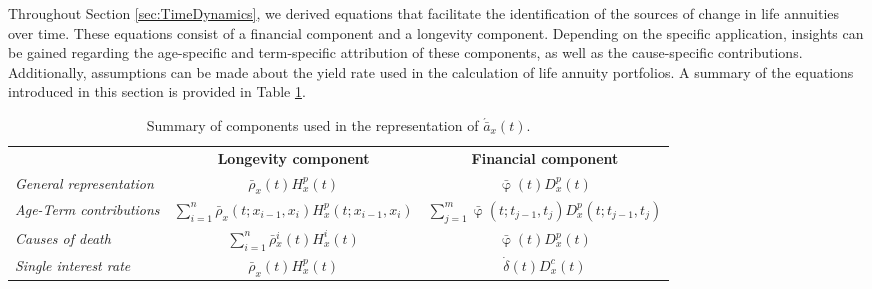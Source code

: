 \documentclass[12pt]{article}
\begin{document}
Throughout Section \ref{sec:TimeDynamics}, we derived equations that facilitate the identification of the sources of change in life annuities over time. These equations consist of a financial component and a longevity component. Depending on the specific application, insights can be gained regarding the age-specific and term-specific attribution of these components, as well as the cause-specific contributions. Additionally, assumptions can be made about the yield rate used in the calculation of life annuity portfolios. A summary of the equations introduced in this section is provided in Table \ref{table:Table1}.

\begin{table}[ht]
	\color{blue}
	\centering
	\begin{tabular}{lcc}
		\toprule
		\textbf{}&	\textbf{Longevity component} & \textbf{Financial component}   \\
	
		\textit{General representation}&	$\bar{\rho}_x(t){H}^{p}_x(t)$ & $\bar{\upvarphi}(t){D}^{p}_x(t)$ \\
		\textit{Age-Term contributions}&	$\sum_{i=1}^n\bar{\rho}_x(t;x_{i-1}, x_i){H}^{p}_x(t;x_{i-1}, x_i)$ & $\sum_{j=1}^m\bar{\upvarphi}(t;t_{j-1},t_{j}){D}^{p}_x(t;t_{j-1},t_{j})$ \\
		
		\textit{Causes of death}&	$\sum_{i=1}^{n} \bar{\rho}{^i_x}(t){H}^{i}_x(t)$ & $\bar{\upvarphi}(t){D}{^p_x}(t)$ \\
	
		\textit{Single interest rate}&	$\bar{\rho}_x(t){H}^{p}_x(t)$ & $\dot{\delta}(t)  D^{c}_x(t)$ \\
		\bottomrule
	\end{tabular}
	\caption{{Summary of components used in the representation of $\acute{\bar{a}}_x(t)$}.}
	\label{table:Table1}
\end{table}

\color{black}

\end{document}
